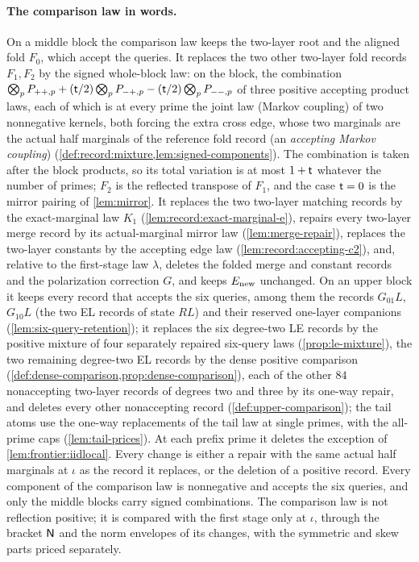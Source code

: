 \paragraph{The comparison law in words.}
On a middle block the comparison law keeps the two-layer root and the aligned
fold $F_0$, which accept the queries. It replaces the two other two-layer fold
records $F_1,F_2$ by the signed whole-block law: on the block, the combination
$\bigotimes_pP_{++,p}+(\mathsf t/2)\bigotimes_pP_{-+,p}-(\mathsf t/2)\bigotimes_pP_{--,p}$
of three positive accepting product laws, each of which is at every prime the
joint law (Markov coupling) of two nonnegative kernels, both
forcing the extra cross edge, whose two marginals are the actual
half marginals of the reference fold record (an \emph{accepting
Markov coupling})
(\cref{def:record:mixture,lem:signed-components}). The combination is taken
after the block products, so its total variation is at most $1+\mathsf t$ whatever
the number of primes; $F_2$ is the reflected transpose of $F_1$, and the case
$\mathsf t=0$ is the mirror pairing of \cref{lem:mirror}. It replaces the two
two-layer matching records by the exact-marginal law $K_1$
(\cref{lem:record:exact-marginal-e}), repairs every two-layer merge record
by its actual-marginal mirror law (\cref{lem:merge-repair}), replaces
the two-layer constants by the accepting edge law
(\cref{lem:record:accepting-c2}), and, relative to the first-stage law
$\lambda$, deletes the folded merge and constant
records and the polarization correction $G$,
and keeps $E_{\rm new}$ unchanged. On an upper block it keeps every record that accepts
the six queries, among them the records $G_{01}L$, $G_{10}L$ (the two EL records of state
$RL$) and their reserved
one-layer companions (\cref{lem:six-query-retention}); it replaces the six
degree-two LE records by the positive mixture of four separately repaired
six-query laws (\cref{prop:le-mixture}), the two remaining degree-two EL records
by the dense positive comparison
(\cref{def:dense-comparison,prop:dense-comparison}), each of the other $84$
nonaccepting two-layer records of degrees two and three by its one-way repair,
and deletes every other nonaccepting record (\cref{def:upper-comparison}); the
tail atoms use the one-way replacements of the tail law at single primes, with
the all-prime caps (\cref{lem:tail-prices}). At each prefix prime it deletes
the exception of \cref{lem:frontier:iidlocal}. Every change is either a repair
with the same actual half marginals at $\iota$ as the record it replaces, or
the deletion of a positive record. Every component of the comparison law is
nonnegative and accepts the six queries, and only the middle blocks carry
signed combinations. The comparison law is not reflection positive; it is
compared with the first stage only at $\iota$, through the bracket $\mathsf N$ and
the norm envelopes of its changes, with the symmetric and skew parts priced
separately.

